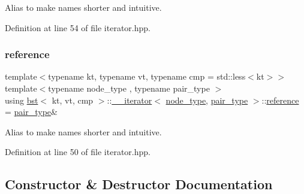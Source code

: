 Alias to make names shorter and intuitive. 

Definition at line 54 of file iterator.\+hpp.

\mbox{\label{classbst_1_1____iterator_a3189983e4edb73a8ce449b290ceb97d1}} 
\subsubsection{\texorpdfstring{reference}{reference}}
{\footnotesize\ttfamily template$<$typename kt, typename vt, typename cmp = std\+::less$<$kt$>$$>$ \\
template$<$typename node\+\_\+type , typename pair\+\_\+type $>$ \\
using \hyperlink{classbst}{bst}$<$ kt, vt, cmp $>$\+::\hyperlink{classbst_1_1____iterator}{\+\_\+\+\_\+iterator}$<$ \hyperlink{classbst_a062eb2a1ac54802dbc4f0f74ae2afd01}{node\+\_\+type}, \hyperlink{classbst_a7b11cca2a3b4394915600194f741ab16}{pair\+\_\+type} $>$\+::\hyperlink{classbst_1_1____iterator_a3189983e4edb73a8ce449b290ceb97d1}{reference} =  \hyperlink{classbst_a7b11cca2a3b4394915600194f741ab16}{pair\+\_\+type}\&}

Alias to make names shorter and intuitive. 

Definition at line 50 of file iterator.\+hpp.



\subsection{Constructor \& Destructor Documentation}
\mbox{\label{classbst_1_1____iterator_a0fabfd3d99d7c15da13123229a4cbede}} 
